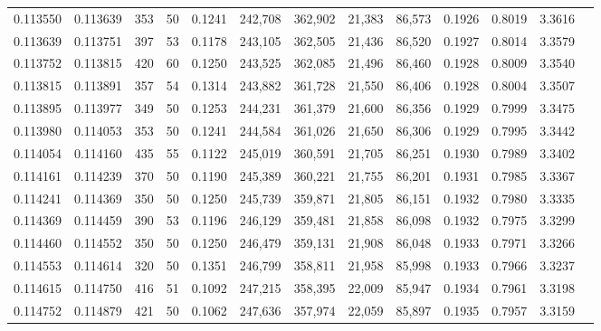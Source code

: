 \begin{tabular}{rrrrrrrrrrrrr}
0.113550 & 0.113639 &   353 &  50 &                                     0.1241 & 242,708 & 362,902 &  21,383 &  86,573 & 0.1926 & 0.8019 & 3.3616 \\
0.113639 & 0.113751 &   397 &  53 &                                     0.1178 & 243,105 & 362,505 &  21,436 &  86,520 & 0.1927 & 0.8014 & 3.3579 \\
0.113752 & 0.113815 &   420 &  60 &                                     0.1250 & 243,525 & 362,085 &  21,496 &  86,460 & 0.1928 & 0.8009 & 3.3540 \\
0.113815 & 0.113891 &   357 &  54 &                                     0.1314 & 243,882 & 361,728 &  21,550 &  86,406 & 0.1928 & 0.8004 & 3.3507 \\
0.113895 & 0.113977 &   349 &  50 &                                     0.1253 & 244,231 & 361,379 &  21,600 &  86,356 & 0.1929 & 0.7999 & 3.3475 \\
0.113980 & 0.114053 &   353 &  50 &                                     0.1241 & 244,584 & 361,026 &  21,650 &  86,306 & 0.1929 & 0.7995 & 3.3442 \\
0.114054 & 0.114160 &   435 &  55 &                                     0.1122 & 245,019 & 360,591 &  21,705 &  86,251 & 0.1930 & 0.7989 & 3.3402 \\
0.114161 & 0.114239 &   370 &  50 &                                     0.1190 & 245,389 & 360,221 &  21,755 &  86,201 & 0.1931 & 0.7985 & 3.3367 \\
0.114241 & 0.114369 &   350 &  50 &                                     0.1250 & 245,739 & 359,871 &  21,805 &  86,151 & 0.1932 & 0.7980 & 3.3335 \\
0.114369 & 0.114459 &   390 &  53 &                                     0.1196 & 246,129 & 359,481 &  21,858 &  86,098 & 0.1932 & 0.7975 & 3.3299 \\
0.114460 & 0.114552 &   350 &  50 &                                     0.1250 & 246,479 & 359,131 &  21,908 &  86,048 & 0.1933 & 0.7971 & 3.3266 \\
0.114553 & 0.114614 &   320 &  50 &                                     0.1351 & 246,799 & 358,811 &  21,958 &  85,998 & 0.1933 & 0.7966 & 3.3237 \\
0.114615 & 0.114750 &   416 &  51 &                                     0.1092 & 247,215 & 358,395 &  22,009 &  85,947 & 0.1934 & 0.7961 & 3.3198 \\
0.114752 & 0.114879 &   421 &  50 &                                     0.1062 & 247,636 & 357,974 &  22,059 &  85,897 & 0.1935 & 0.7957 & 3.3159 \\

\end{tabular}
